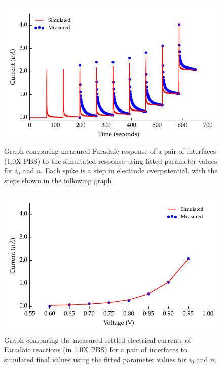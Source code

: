         \begin{figure}
          \centering
          \includegraphics{content/pt2/08-InterfaceParameters/graphics/graph_faradaic_currentVsTimeThesis}
          \caption{\label{fig:graph_faradaic_currentVsTimeThesis} Graph comparing measured Faradaic response of a pair of interfaces (1.0X PBS) to the simultated response using fitted parameter values for $i_0$ and $n$. Each spike is a step in electrode overpotential, with the steps shown in the following graph.}
        \end{figure}
        \begin{figure}
          \centering
          \includegraphics{content/pt2/08-InterfaceParameters/graphics/graph_faradaic_currentVsVoltageThesis}
          \caption{\label{fig:graph_faradaic_currentVsVoltageThesis} Graph comparing the measured settled electrical currents of Faradaic reactions (in 1.0X PBS) for a pair of interfaces to simulated final values using the fitted parameter values for $i_0$ and $n$.}
        \end{figure}
